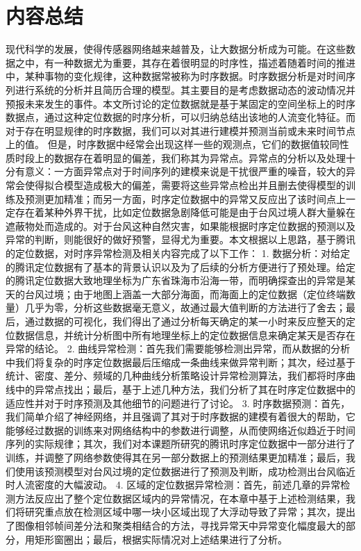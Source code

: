 \documentclass[a4paper,AutoFakeBold,oneside,12pt]{book}
\begin{document}
{{\section{内容总结}
现代科学的发展，使得传感器网络越来越普及，让大数据分析成为可能。在这些数据之中，有一种数据尤为重要，其存在着很明显的时序性，描述着随着时间的推进中，某种事物的变化规律，这种数据常被称为时序数据。时序数据分析是对时间序列进行系统的分析并且简历合理的模型。其主要目的是考虑数据动态的波动情况并预报未来发生的事件。本文所讨论的定位数据就是基于某固定的空间坐标上的时序数据点，通过这种定位数据的时序分析，可以归纳总结出该地的人流变化特征。而对于存在明显规律的时序数据，我们可以对其进行建模并预测当前或未来时间节点上的值。
	但是，时序数据中经常会出现这样一些的观测点，它们的数据值较同性质时段上的数据存在着明显的偏差，我们称其为异常点。异常点的分析以及处理十分有意义：一方面异常点对于时间序列的建模来说是干扰很严重的噪音，较大的异常会使得拟合模型造成极大的偏差，需要将这些异常点检出并且删去使得模型的训练及预测更加精准；而另一方面，时序定位数据中的异常又反应出了该时间点上一定存在着某种外界干扰，比如定位数据急剧降低可能是由于台风过境人群大量躲在遮蔽物处而造成的。对于台风这种自然灾害，如果能根据时序定位数据的预测以及异常的判断，则能很好的做好预警，显得尤为重要。本文根据以上思路，基于腾讯的定位数据，对时序异常检测及相关内容完成了以下工作：
	1. 数据分析：对给定的腾讯定位数据有了基本的背景认识以及为了后续的分析方便进行了预处理。给定的腾讯定位数据大致地理坐标为广东省珠海市沿海一带，而明确探查出的异常是某天的台风过境；由于地图上涵盖一大部分海面，而海面上的定位数据（定位终端数量）几乎为零，分析这些数据毫无意义，故通过最大值判断的方法进行了舍去；最后，通过数据的可视化，我们得出了通过分析每天确定的某一小时来反应整天的定位数据信息，并统计分析图中所有地理坐标上的定位数据信息来确定某天是否存在异常的结论。
	2. 曲线异常检测：首先我们需要能够检测出异常，而从数据的分析中我们将复杂的时序定位数据最后压缩成一条曲线来做异常判断；其次，经过基于统计、密度、差分、频域的几种曲线分析策略设计异常检测算法，我们都将时序曲线中的异常点找出；最后，基于上述几种方法，我们分析了其在时序定位数据中的适应性并对于时序预测及其他细节的问题进行了讨论。
	3. 时序数据预测：首先，我们简单介绍了神经网络，并且强调了其对于时序数据的建模有着很大的帮助，它能够经过数据的训练来对网络结构中的参数进行调整，从而使网络近似趋近于时间序列的实际规律；其次，我们对本课题所研究的腾讯时序定位数据中一部分进行了训练，并调整了网络参数使得其在另一部分数据上的预测结果更加精准；最后，我们使用该预测模型对台风过境的定位数据进行了预测及判断，成功检测出台风临近时人流密度的大幅波动。
	4. 区域的定位数据异常检测：首先，前述几章的异常检测方法反应出了整个定位数据区域内的异常情况，在本章中基于上述检测结果，我们将研究重点放在检测区域中哪一块小区域出现了大浮动导致了异常；其次，提出了图像相邻帧间差分法和聚类相结合的方法，寻找异常天中异常变化幅度最大的部分，用矩形窗圈出；最后，根据实际情况对上述结果进行了分析。

}}
\end{document}
